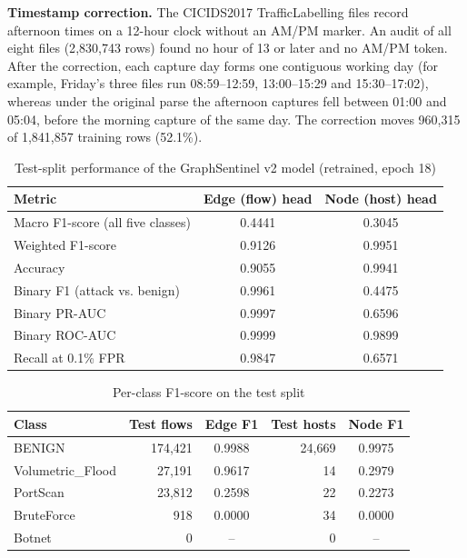 \documentclass[12pt,a4paper]{report}
\begin{document}
\par\textbf{Timestamp correction.} The CICIDS2017 TrafficLabelling files record afternoon times on a 12-hour clock without an AM/PM marker. An audit of all eight files (2{,}830{,}743 rows) found no hour of 13 or later and no AM/PM token. After the correction, each capture day forms one contiguous working day (for example, Friday's three files run 08:59--12:59, 13:00--15:29 and 15:30--17:02), whereas under the original parse the afternoon captures fell between 01:00 and 05:04, before the morning capture of the same day. The correction moves 960{,}315 of 1{,}841{,}857 training rows (52.1\%).

\begin{table}[htbp]
\caption{Test-split performance of the GraphSentinel v2 model (retrained, epoch 18)}
\label{tab:ml_overall}
\centering
\begin{tabular}{|l|c|c|}
\hline
\textbf{Metric} & \textbf{Edge (flow) head} & \textbf{Node (host) head} \\
\hline
Macro F1-score (all five classes) & 0.4441 & 0.3045 \\
Weighted F1-score & 0.9126 & 0.9951 \\
Accuracy & 0.9055 & 0.9941 \\
Binary F1 (attack vs. benign) & 0.9961 & 0.4475 \\
Binary PR-AUC & 0.9997 & 0.6596 \\
Binary ROC-AUC & 0.9999 & 0.9899 \\
Recall at 0.1\% FPR & 0.9847 & 0.6571 \\
\hline
\end{tabular}
\end{table}

\begin{table}[htbp]
\caption{Per-class F1-score on the test split}
\label{tab:ml_perclass}
\centering
\begin{tabular}{|l|r|c|r|c|}
\hline
\textbf{Class} & \textbf{Test flows} & \textbf{Edge F1} & \textbf{Test hosts} & \textbf{Node F1} \\
\hline
BENIGN & 174{,}421 & 0.9988 & 24{,}669 & 0.9975 \\
Volumetric\_Flood & 27{,}191 & 0.9617 & 14 & 0.2979 \\
PortScan & 23{,}812 & 0.2598 & 22 & 0.2273 \\
BruteForce & 918 & 0.0000 & 34 & 0.0000 \\
Botnet & 0 & -- & 0 & -- \\
\hline
\end{tabular}
\end{table}
\end{document}
